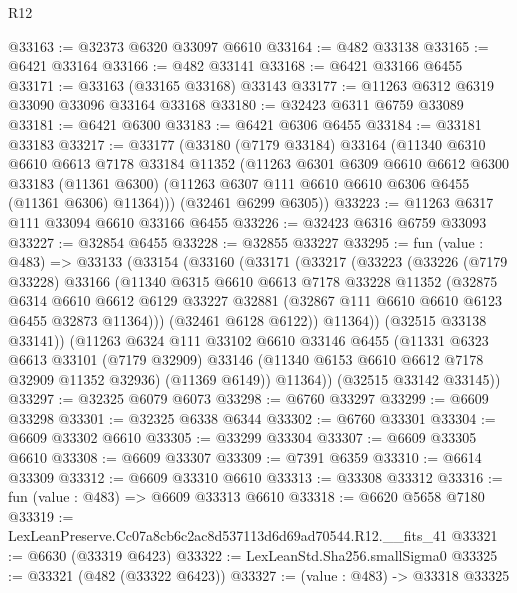 \begin{lexlean}{R12}
\begin{coremodule}
@33163 := @32373 @6320 @33097 @6610
@33164 := @482 @33138
@33165 := @6421 @33164
@33166 := @482 @33141
@33168 := @6421 @33166 @6455
@33171 := @33163 (@33165 @33168) @33143
@33177 := @11263 @6312 @6319 @33090 @33096 @33164 @33168
@33180 := @32423 @6311 @6759 @33089
@33181 := @6421 @6300
@33183 := @6421 @6306 @6455
@33184 := @33181 @33183
@33217 := @33177
    (@33180
      (@7179 @33184)
      @33164
      (@11340
        @6310
        @6610
        @6613
        @7178
        @33184
        @11352
        (@11263
          @6301
          @6309
          @6610
          @6612
          @6300
          @33183
          (@11361 @6300)
          (@11263 @6307 @111 @6610 @6610 @6306 @6455 (@11361 @6306) @11364)))
      (@32461 @6299 @6305))
@33223 := @11263 @6317 @111 @33094 @6610 @33166 @6455
@33226 := @32423 @6316 @6759 @33093
@33227 := @32854 @6455
@33228 := @32855 @33227
@33295 := fun (value : @483) =>
  @33133
    (@33154
      (@33160
        (@33171
          (@33217
            (@33223
              (@33226
                (@7179 @33228)
                @33166
                (@11340
                  @6315
                  @6610
                  @6613
                  @7178
                  @33228
                  @11352
                  (@32875
                    @6314
                    @6610
                    @6612
                    @6129
                    @33227
                    @32881
                    (@32867 @111 @6610 @6610 @6123 @6455 @32873 @11364)))
                (@32461 @6128 @6122))
              @11364))
          (@32515 @33138 @33141))
        (@11263
          @6324
          @111
          @33102
          @6610
          @33146
          @6455
          (@11331
            @6323
            @6613
            @33101
            (@7179 @32909)
            @33146
            (@11340 @6153 @6610 @6612 @7178 @32909 @11352 @32936)
            (@11369 @6149))
          @11364))
      (@32515 @33142 @33145))
@33297 := @32325 @6079 @6073
@33298 := @6760 @33297
@33299 := @6609 @33298
@33301 := @32325 @6338 @6344
@33302 := @6760 @33301
@33304 := @6609 @33302 @6610
@33305 := @33299 @33304
@33307 := @6609 @33305 @6610
@33308 := @6609 @33307
@33309 := @7391 @6359
@33310 := @6614 @33309
@33312 := @6609 @33310 @6610
@33313 := @33308 @33312
@33316 := fun (value : @483) => @6609 @33313 @6610
@33318 := @6620 @5658 @7180
@33319 := LexLeanPreserve.Cc07a8cb6c2ac8d537113d6d69ad70544.R12.__fits_41
@33321 := @6630 (@33319 @6423)
@33322 := LexLeanStd.Sha256.smallSigma0
@33325 := @33321 (@482 (@33322 @6423))
@33327 := (value : @483) -> @33318 @33325

\end{coremodule}
\end{lexlean}
